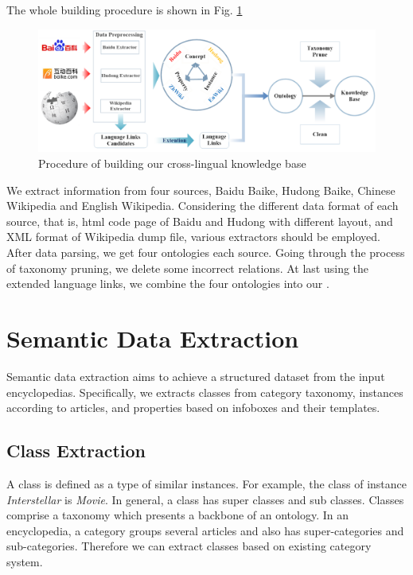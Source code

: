 \documentclass[runningheads,a4paper]{llncs}
\begin{document}
The whole building procedure is shown in Fig. \ref{fig:procedure}
\begin{figure}[ht]
    \centerline{\includegraphics[width=1\columnwidth]{fig/procedure}}
    \caption{Procedure of building our cross-lingual knowledge base}
    \label{fig:procedure}
\end{figure}%
We extract information from four sources, Baidu Baike, Hudong Baike, Chinese Wikipedia and English Wikipedia. Considering the different data format of each source, that is, html code page of Baidu and Hudong with different layout, and XML format of Wikipedia dump file, various extractors should be employed. After data parsing, we get four ontologies each source. Going through the process of taxonomy pruning, we delete some incorrect relations. At last using the extended language links, we combine the four ontologies into our .

\section{Semantic Data Extraction}
\label{sec:dp}
Semantic data extraction aims to achieve a structured dataset from the input encyclopedias. Specifically, we extracts classes from category taxonomy, instances according to articles, and properties based on infoboxes and their templates.

\subsection{Class Extraction}
\label{sec:ce}
A class is defined as a type of similar instances. For example, the class of instance \emph{Interstellar} is \emph{Movie}. In general, a class has super classes and sub classes. Classes comprise a taxonomy which presents a backbone of an ontology. In an encyclopedia, a category groups several articles and also has super-categories and sub-categories. Therefore we can extract classes based on existing category system.
\end{document}

